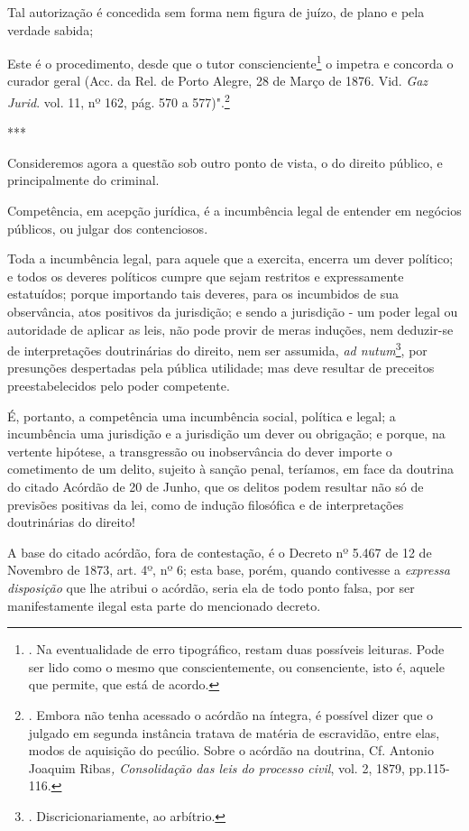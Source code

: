 Tal autorização é concedida sem forma nem figura de juízo, de plano e
pela verdade sabida;

Este é o procedimento, desde que o tutor conscienciente\footnote{. Na
  eventualidade de erro tipográfico, restam duas possíveis leituras.
  Pode ser lido como o mesmo que conscientemente, ou consenciente, isto
  é, aquele que permite, que está de acordo.} o impetra e concorda o
curador geral (Acc. da Rel. de Porto Alegre, 28 de Março de 1876. Vid.
\emph{Gaz Jurid}. vol. 11, nº 162, pág. 570 a 577)".\footnote{. Embora
  não tenha acessado o acórdão na íntegra, é possível dizer que o
  julgado em segunda instância tratava de matéria de escravidão, entre
  elas, modos de aquisição do pecúlio. Sobre o acórdão na doutrina, Cf.
  Antonio Joaquim Ribas\emph{, Consolidação das leis do processo civil},
  vol. 2, 1879, pp.115-116.}

***

Consideremos agora a questão sob outro ponto de vista, o do direito
público, e principalmente do criminal.

Competência, em acepção jurídica, é a incumbência legal de entender em
negócios públicos, ou julgar dos contenciosos.

Toda a incumbência legal, para aquele que a exercita, encerra um dever
político; e todos os deveres políticos cumpre que sejam restritos e
expressamente estatuídos; porque importando tais deveres, para os
incumbidos de sua observância, atos positivos da jurisdição; e sendo a
jurisdição - um poder legal ou autoridade de aplicar as leis, não pode
provir de meras induções, nem deduzir-se de interpretações doutrinárias
do direito, nem ser assumida, \emph{ad nutum}\footnote{.
  Discricionariamente, ao arbítrio.}, por presunções despertadas pela
pública utilidade; mas deve resultar de preceitos preestabelecidos pelo
poder competente.

É, portanto, a competência uma incumbência social, política e legal; a
incumbência uma jurisdição e a jurisdição um dever ou obrigação; e
porque, na vertente hipótese, a transgressão ou inobservância do dever
importe o cometimento de um delito, sujeito à sanção penal, teríamos, em
face da doutrina do citado Acórdão de 20 de Junho, que os delitos podem
resultar não só de previsões positivas da lei, como de indução
filosófica e de interpretações doutrinárias do direito!

A base do citado acórdão, fora de contestação, é o Decreto nº 5.467 de
12 de Novembro de 1873, art. 4º, nº 6; esta base, porém, quando
contivesse a \emph{expressa disposição} que lhe atribui o acórdão, seria
ela de todo ponto falsa, por ser manifestamente ilegal esta parte do
mencionado decreto.

